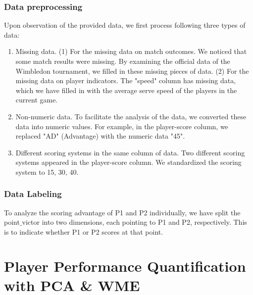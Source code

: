 \documentclass[12pt]{article}%
\begin{document}
	\subsubsection{Data preprocessing}
	Upon observation of the provided data, we first process following three types of data: 
		\begin{enumerate}[\bfseries 1.]
		\setlength{\parsep}{0ex} %
		\setlength{\topsep}{1ex} %
		\setlength{\itemsep}{0.6ex} %
		\item  Missing data. (1) For the missing data on match outcomes. We noticed that some match results were missing. By examining the official data of the Wimbledon tournament, we filled in these missing pieces of data. (2) For the missing data on player indicators. The "speed" column has missing data, which we have filled in with the average serve speed of the players in the current game.
		\item Non-numeric data. To facilitate the analysis of the data, we converted these data into numeric values. For example, in the player-score column, we replaced "AD" (Advantage) with the numeric data "45".
		\item Different scoring systems in the same column of data. Two different scoring systems appeared in the player-score column. We standardized the scoring system to 15, 30, 40.

	\end{enumerate}

\subsubsection{Data Labeling}
 To analyze the scoring advantage of P1 and P2 individually, we have split the point$\_$victor into two dimensions, each pointing to P1 and P2, respectively. This is to indicate whether P1 or P2 scores at that point.
	
	
	
\section{Player Performance Quantification with PCA \& WME}
\end{document}
